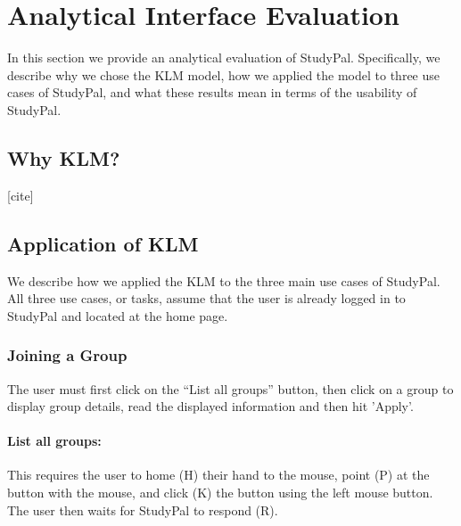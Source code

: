 \documentclass[conference]{IEEEtran}
\begin{document}
\section{Analytical Interface Evaluation}
 

 
In this section we provide an analytical evaluation of StudyPal.
Specifically, we describe why we chose the KLM model\cite{Card:KLM}, how we applied the model to three use cases of StudyPal, and what these results mean in terms of the usability of StudyPal.

\subsection{Why KLM?}
[cite]


\subsection{Application of KLM}
We describe how we applied the KLM to the three main use cases of StudyPal.
All three use cases, or tasks, assume that the user is already logged in to StudyPal and located at the home page.

\subsubsection{Joining a Group}
The user must first click on the ``List all groups'' button, then click on a group to display group details, read the displayed information and then hit 'Apply'.

\paragraph{List all groups:}
This requires the user to home (H) their hand to the mouse, point (P) at the button with the mouse, and click (K) the button using the left mouse button.
The user then waits for StudyPal to respond (R).
\end{document}
